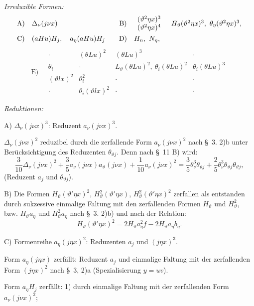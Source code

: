 \documentclass[11pt]{article}
\newcommand{\A}{\Delta}
\begin{document}
\noindent\emph{Irreduzible Formen:}
\[
\begin{array}{c@{\quad}l@{\qquad}c@{\quad}l}
\text{A)}&\A_\nu(j\nu x)&
\text{B)}&\begin{array}{c}(\vartheta^2\eta x)^3\\(\vartheta^2\eta x)^4\end{array}
\quad H_\vartheta(\vartheta^2\eta x)^3,
\ \theta_\eta(\vartheta^2\eta x)^3,\\[1em]
\text{C)}&(aHu)H_j,
\quad a_\eta(aHu)H_j&
\text{D)}&H_n,
\ N_\eta,
\end{array}
\]
\[
\text{E)}\quad
\begin{array}{c|c|c|c}
\cdot&(\theta Lu)^2&(\theta Lu)^3&\cdot\\
\theta_i&\cdot&L_\vartheta(\theta Lu)^2,
\ \theta_i(\theta Lu)^2&\theta_i(\theta Lu)^3\\
(\vartheta lx)^2&\theta_i^2&\cdot&\cdot\\
\cdot&\theta_i(\vartheta lx)^2&\cdot&\cdot
\end{array}
\]

\noindent\emph{Reduktionen:}

\noindent A) $\A_\nu(j\nu x)^3$: Reduzent $a_\nu(j\nu x)^3$.

$\A_\nu(j\nu x)^2$ reduzibel durch die zerfallende Form $a_\nu(j\nu x)^2$ nach \S\ 3. 2)b unter Berücksichtigung des Reduzenten $\theta_{\vartheta j}$. Denn nach \S\ 11 B) wird:
\[
\frac3{10}\A_\nu(j\nu x)^2+\frac35a_\nu(j\nu x)a_\vartheta(j\nu x)
+\frac1{10}a_\nu(j\nu x)^2
=\frac35\theta_\nu^3\theta_{\vartheta j}+\frac25\theta_\nu^3\theta_{\vartheta j}\theta_{\vartheta j},
\]
(Reduzent $a_j$ und $\theta_{\vartheta j}$).

\noindent B) Die Formen $H_\vartheta(\vartheta'\eta x)^2$, $H_\vartheta^2(\vartheta'\eta x)$, $H_\vartheta^2(\vartheta'\eta x)^2$ zerfallen als entstanden durch sukzessive einmalige Faltung mit den zerfallenden Formen $H_\vartheta$ und $H_\vartheta^2$, bzw. $H_\vartheta a_\eta$ und $H_\vartheta^2a_\eta$ nach \S\ 3. 2)b) und nach der Relation:
\[
H_\vartheta(\vartheta'\eta x)^2=2H_\vartheta a_\eta^2f-2H_\vartheta a_\eta b_\eta.
\]

\noindent C) Formenreihe $a_\eta(j\eta x)^2$: Reduzenten $a_j$ und $(j\eta x)^3$.

Form $a_\eta(j\eta x)$ zerfällt: Reduzent $a_j$ und einmalige Faltung mit der zerfallenden Form $(j\eta x)^2$ nach \S\ 3, 2)a (Spezialisierung $y=uv$).

Form $a_\eta H_j$ zerfällt: 1) durch einmalige Faltung mit der zerfallenden Form $a_\nu(j\nu x)^2$;
\end{document}
